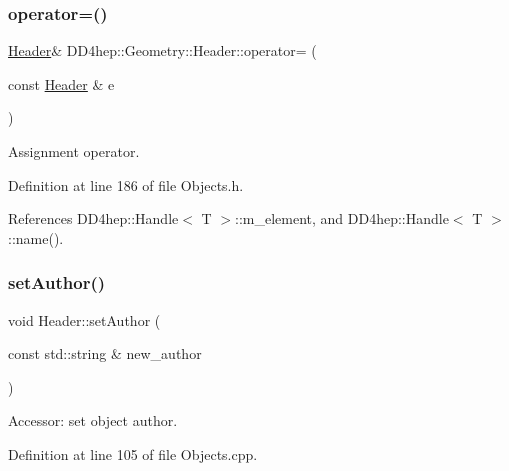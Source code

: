\subsubsection{\texorpdfstring{operator=()}{operator=()}}
{\footnotesize\ttfamily \hyperlink{class_d_d4hep_1_1_geometry_1_1_header}{Header}\& D\+D4hep\+::\+Geometry\+::\+Header\+::operator= (\begin{DoxyParamCaption}\item[{const \hyperlink{class_d_d4hep_1_1_geometry_1_1_header}{Header} \&}]{e }\end{DoxyParamCaption})\hspace{0.3cm}{\ttfamily [inline]}}



Assignment operator. 



Definition at line 186 of file Objects.\+h.



References D\+D4hep\+::\+Handle$<$ T $>$\+::m\+\_\+element, and D\+D4hep\+::\+Handle$<$ T $>$\+::name().

\hypertarget{class_d_d4hep_1_1_geometry_1_1_header_a7efa4948ea5e1a980bc15a88522f7618}{}\label{class_d_d4hep_1_1_geometry_1_1_header_a7efa4948ea5e1a980bc15a88522f7618} 
\subsubsection{\texorpdfstring{set\+Author()}{setAuthor()}}
{\footnotesize\ttfamily void Header\+::set\+Author (\begin{DoxyParamCaption}\item[{const std\+::string \&}]{new\+\_\+author }\end{DoxyParamCaption})}



Accessor\+: set object author. 



Definition at line 105 of file Objects.\+cpp.

\hypertarget{class_d_d4hep_1_1_geometry_1_1_header_afd7df593939068d26d155478d6350481}{}\label{class_d_d4hep_1_1_geometry_1_1_header_afd7df593939068d26d155478d6350481} 
